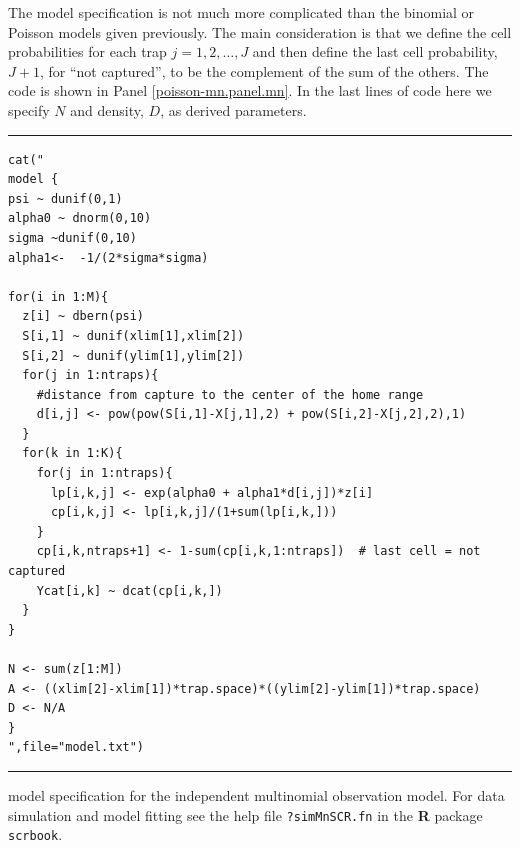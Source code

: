 The model specification is not much more complicated than the binomial
or Poisson models given previously. The main consideration is that we
define the cell probabilities for each trap $j=1,2,\dots,J$ and then
define the last cell probability, $J+1$, for ``not captured'', to be
the complement of the sum of the others. The code is shown in Panel
\ref{poisson-mn.panel.mn}.  In the last lines of code here we specify
$N$ and density, $D$, as derived parameters.

\begin{panel}[htp]
\centering
\rule[0.15in]{\textwidth}{.03in}
{\small
\begin{verbatim}
cat("
model {
psi ~ dunif(0,1)
alpha0 ~ dnorm(0,10)
sigma ~dunif(0,10)
alpha1<-  -1/(2*sigma*sigma)

for(i in 1:M){
  z[i] ~ dbern(psi)
  S[i,1] ~ dunif(xlim[1],xlim[2])
  S[i,2] ~ dunif(ylim[1],ylim[2])
  for(j in 1:ntraps){
    #distance from capture to the center of the home range
    d[i,j] <- pow(pow(S[i,1]-X[j,1],2) + pow(S[i,2]-X[j,2],2),1)
  }
  for(k in 1:K){
    for(j in 1:ntraps){
      lp[i,k,j] <- exp(alpha0 + alpha1*d[i,j])*z[i]
      cp[i,k,j] <- lp[i,k,j]/(1+sum(lp[i,k,]))
    }
    cp[i,k,ntraps+1] <- 1-sum(cp[i,k,1:ntraps])  # last cell = not captured
    Ycat[i,k] ~ dcat(cp[i,k,])
  }
}

N <- sum(z[1:M])
A <- ((xlim[2]-xlim[1])*trap.space)*((ylim[2]-ylim[1])*trap.space)
D <- N/A
}
",file="model.txt")

\end{verbatim}
}
\rule[-0.15in]{\textwidth}{.03in}
\caption{
\winbugs model specification for the independent multinomial
observation model. For data simulation and model fitting see the
help file \mbox{\tt ?simMnSCR.fn} in the {\bf R} package \mbox{\tt scrbook}.
}
\label{poisson-mn.panel.mn}
\end{panel}


